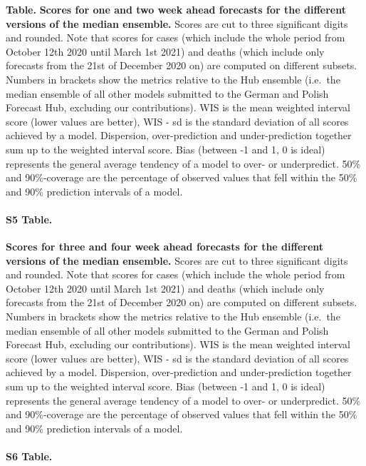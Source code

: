 \documentclass[10pt,letterpaper]{article}
\begin{document}
\textbf{Table.} \label{tab:score-table-ensemble-2}
\textbf{Scores for one and two week ahead forecasts for the different versions of the median ensemble.}
Scores are cut to three significant digits and rounded. Note that scores
for cases (which include the whole period from October 12th 2020 until
March 1st 2021) and deaths (which include only forecasts from the 21st
of December 2020 on) are computed on different subsets. Numbers in
brackets show the metrics relative to the Hub ensemble (i.e.~the median
ensemble of all other models submitted to the German and Polish Forecast
Hub, excluding our contributions). WIS is the mean weighted interval
score (lower values are better), WIS - sd is the standard deviation of
all scores achieved by a model. Dispersion, over-prediction and
under-prediction together sum up to the weighted interval score. Bias
(between -1 and 1, 0 is ideal) represents the general average tendency
of a model to over- or underpredict. 50\% and 90\%-coverage are the
percentage of observed values that fell within the 50\% and 90\%
prediction intervals of a model.

\paragraph{S5 Table.}
\label{tab:score-table-ensemble-4}

\textbf{Scores for three and four week ahead forecasts for the different versions of the median ensemble.}
Scores are cut to three significant digits and rounded. Note that scores
for cases (which include the whole period from October 12th 2020 until
March 1st 2021) and deaths (which include only forecasts from the 21st
of December 2020 on) are computed on different subsets. Numbers in
brackets show the metrics relative to the Hub ensemble (i.e.~the median
ensemble of all other models submitted to the German and Polish Forecast
Hub, excluding our contributions). WIS is the mean weighted interval
score (lower values are better), WIS - sd is the standard deviation of
all scores achieved by a model. Dispersion, over-prediction and
under-prediction together sum up to the weighted interval score. Bias
(between -1 and 1, 0 is ideal) represents the general average tendency
of a model to over- or underpredict. 50\% and 90\%-coverage are the
percentage of observed values that fell within the 50\% and 90\%
prediction intervals of a model.

\paragraph{S6 Table.}
\label{tab:score-table-ensemble-mean-2}
\end{document}
